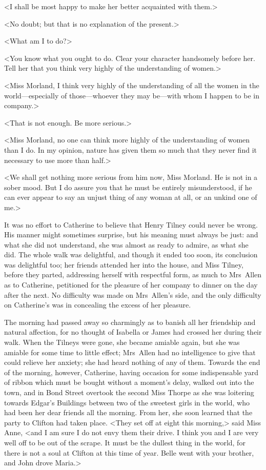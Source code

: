  <I shall be most happy to make her better acquainted with them.> 

 <No doubt; but that is no explanation of the present.> 

 <What am I to do?> 

 <You know what you ought to do. Clear your character handsomely before her. Tell her that you think very highly of the understanding of women.> 

 <Miss Morland, I think very highly of the understanding of all the women in the world—especially of those—whoever they may be—with whom I happen to be in company.> 

 <That is not enough. Be more serious.> 

 <Miss Morland, no one can think more highly of the understanding of women than I do. In my opinion, nature has given them so much that they never find it necessary to use more than half.> 

 <We shall get nothing more serious from him now, Miss Morland. He is not in a sober mood. But I do assure you that he must be entirely misunderstood, if he can ever appear to say an unjust thing of any woman at all, or an unkind one of me.> 

 It was no effort to Catherine to believe that Henry Tilney could never be wrong. His manner might sometimes surprise, but his meaning must always be just: and what she did not understand, she was almost as ready to admire, as what she did. The whole walk was delightful, and though it ended too soon, its conclusion was delightful too; her friends attended her into the house, and Miss Tilney, before they parted, addressing herself with respectful form, as much to Mrs~Allen as to Catherine, petitioned for the pleasure of her company to dinner on the day after the next. No difficulty was made on Mrs~Allen's side, and the only difficulty on Catherine's was in concealing the excess of her pleasure. 

 The morning had passed away so charmingly as to banish all her friendship and natural affection, for no thought of Isabella or James had crossed her during their walk. When the Tilneys were gone, she became amiable again, but she was amiable for some time to little effect; Mrs~Allen had no intelligence to give that could relieve her anxiety; she had heard nothing of any of them. Towards the end of the morning, however, Catherine, having occasion for some indispensable yard of ribbon which must be bought without a moment's delay, walked out into the town, and in Bond Street overtook the second Miss Thorpe as she was loitering towards Edgar's Buildings between two of the sweetest girls in the world, who had been her dear friends all the morning. From her, she soon learned that the party to Clifton had taken place. <They set off at eight this morning,> said Miss Anne, <and I am sure I do not envy them their drive. I think you and I are very well off to be out of the scrape. It must be the dullest thing in the world, for there is not a soul at Clifton at this time of year. Belle went with your brother, and John drove Maria.> 


